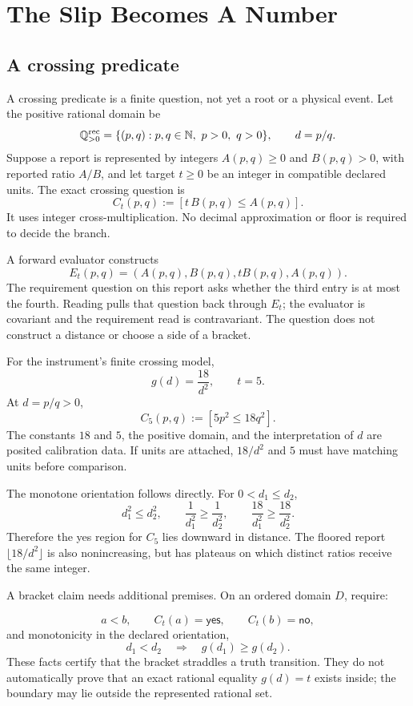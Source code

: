 \chapter{The Slip Becomes A Number}

\section{A crossing predicate}

A crossing predicate is a finite question, not yet a root or a physical event.  Let the positive rational domain be
\[
 \mathbb Q_{>0}^{\rm rec}
 =\{(p,q):p,q\in\mathbb N,\ p>0,\ q>0\},
 \qquad d=p/q.
\]
Suppose a report is represented by integers \(A(p,q)\ge0\) and \(B(p,q)>0\), with reported ratio \(A/B\), and let
target \(t\ge0\) be an integer in compatible declared units.  The exact crossing question is
\[
                  C_t(p,q):=[t\,B(p,q)\le A(p,q)].
\]
It uses integer cross-multiplication.  No decimal approximation or floor is required to decide the branch.

A forward evaluator constructs
\[
 E_t(p,q)=(A(p,q),B(p,q),tB(p,q),A(p,q)).
\]
The requirement question on this report asks whether the third entry is at most the fourth.  Reading pulls that question
back through \(E_t\); the evaluator is covariant and the requirement read is contravariant.  The question does not
construct a distance or choose a side of a bracket.

For the instrument's finite crossing model,
\[
                    g(d)=\frac{18}{d^2},\qquad t=5.
\]
At \(d=p/q>0\),
\[
              C_5(p,q):=[5p^2\le18q^2].
\]
The constants \(18\) and \(5\), the positive domain, and the interpretation of \(d\) are posited calibration data.
If units are attached, \(18/d^2\) and \(5\) must have matching units before comparison.

The monotone orientation follows directly.  For \(0<d_1\le d_2\),
\[
 d_1^2\le d_2^2,\qquad
 \frac1{d_1^2}\ge\frac1{d_2^2},\qquad
 \frac{18}{d_1^2}\ge\frac{18}{d_2^2}.
\]
Therefore the yes region for \(C_5\) lies downward in distance.  The floored report
\(\lfloor18/d^2\rfloor\) is also nonincreasing, but has plateaus on which distinct ratios receive the same integer.

A bracket claim needs additional premises.  On an ordered domain \(D\), require:

\[
 a<b,\qquad C_t(a)=\mathsf{yes},\qquad C_t(b)=\mathsf{no},
\]
and monotonicity in the declared orientation,
\[
 d_1<d_2\quad\Longrightarrow\quad g(d_1)\ge g(d_2).
\]
These facts certify that the bracket straddles a truth transition.  They do not automatically prove that an exact
rational equality \(g(d)=t\) exists inside; the boundary may lie outside the represented rational set.

